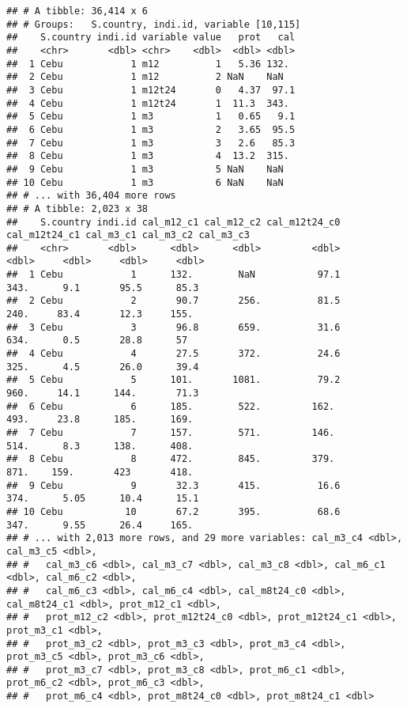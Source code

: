 \documentclass[
]{book}
\begin{document}
\begin{verbatim}
## # A tibble: 36,414 x 6
## # Groups:   S.country, indi.id, variable [10,115]
##    S.country indi.id variable value   prot   cal
##    <chr>       <dbl> <chr>    <dbl>  <dbl> <dbl>
##  1 Cebu            1 m12          1   5.36 132. 
##  2 Cebu            1 m12          2 NaN    NaN  
##  3 Cebu            1 m12t24       0   4.37  97.1
##  4 Cebu            1 m12t24       1  11.3  343. 
##  5 Cebu            1 m3           1   0.65   9.1
##  6 Cebu            1 m3           2   3.65  95.5
##  7 Cebu            1 m3           3   2.6   85.3
##  8 Cebu            1 m3           4  13.2  315. 
##  9 Cebu            1 m3           5 NaN    NaN  
## 10 Cebu            1 m3           6 NaN    NaN  
## # ... with 36,404 more rows
## # A tibble: 2,023 x 38
##    S.country indi.id cal_m12_c1 cal_m12_c2 cal_m12t24_c0 cal_m12t24_c1 cal_m3_c1 cal_m3_c2 cal_m3_c3
##    <chr>       <dbl>      <dbl>      <dbl>         <dbl>         <dbl>     <dbl>     <dbl>     <dbl>
##  1 Cebu            1      132.        NaN           97.1          343.      9.1       95.5      85.3
##  2 Cebu            2       90.7       256.          81.5          240.     83.4       12.3     155. 
##  3 Cebu            3       96.8       659.          31.6          634.      0.5       28.8      57  
##  4 Cebu            4       27.5       372.          24.6          325.      4.5       26.0      39.4
##  5 Cebu            5      101.       1081.          79.2          960.     14.1      144.       71.3
##  6 Cebu            6      185.        522.         162.           493.     23.8      185.      169. 
##  7 Cebu            7      157.        571.         146.           514.      8.3      138.      408. 
##  8 Cebu            8      472.        845.         379.           871.    159.       423       418. 
##  9 Cebu            9       32.3       415.          16.6          374.      5.05      10.4      15.1
## 10 Cebu           10       67.2       395.          68.6          347.      9.55      26.4     165. 
## # ... with 2,013 more rows, and 29 more variables: cal_m3_c4 <dbl>, cal_m3_c5 <dbl>,
## #   cal_m3_c6 <dbl>, cal_m3_c7 <dbl>, cal_m3_c8 <dbl>, cal_m6_c1 <dbl>, cal_m6_c2 <dbl>,
## #   cal_m6_c3 <dbl>, cal_m6_c4 <dbl>, cal_m8t24_c0 <dbl>, cal_m8t24_c1 <dbl>, prot_m12_c1 <dbl>,
## #   prot_m12_c2 <dbl>, prot_m12t24_c0 <dbl>, prot_m12t24_c1 <dbl>, prot_m3_c1 <dbl>,
## #   prot_m3_c2 <dbl>, prot_m3_c3 <dbl>, prot_m3_c4 <dbl>, prot_m3_c5 <dbl>, prot_m3_c6 <dbl>,
## #   prot_m3_c7 <dbl>, prot_m3_c8 <dbl>, prot_m6_c1 <dbl>, prot_m6_c2 <dbl>, prot_m6_c3 <dbl>,
## #   prot_m6_c4 <dbl>, prot_m8t24_c0 <dbl>, prot_m8t24_c1 <dbl>
\end{verbatim}
\end{document}
